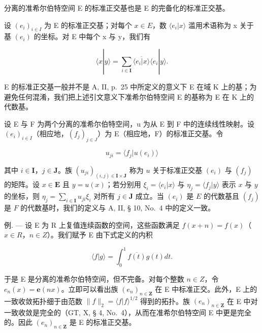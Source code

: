 分离的准希尔伯特空间 E 的标准正交基也是 E 的完备化的标准正交基。

设 \((e_{i})_{i\in I}\) 为 E 的标准正交基；对每个 \(x\in E\)，数 \(\langle e_{i}|x\rangle\) 滥用术语称为 x 关于基 \((e_{i})\) 的坐标。对 E 中每个 x 与 y，我们有

\[
\langle x | y \rangle = \sum_ {i \in \mathbf {I}} \overline {{\langle e _ {i} | x \rangle}} \langle e _ {i} | y \rangle .\tag{3}
\]

E 的标准正交基一般并不是 A, II, p.~25 中所定义的意义下 E 在域 K 上的基；为避免任何混淆，我们把上述引文意义下准希尔伯特空间 E 的基称为 E 在 K 上的代数基。

设 E 与 F 为两个分离的准希尔伯特空间，u 为从 E 到 F 中的连续线性映射。设 \((e_{i})_{i\in I}\)（相应地，\((f_{j})_{j\in J}\)）为 E（相应地，F）的标准正交基。令

\[
u _ {j i} = \langle f _ {j} | u (e _ {i}) \rangle
\]

其中 \(i \in \mathbf{I}\)，\(j \in \mathbf{J}\)。族 \((u_{ji})_{(i,j) \in \mathbf{I} \times \mathbf{J}}\) 称为 \(u\) 关于标准正交基 \((e_i)\) 与 \((f_j)\) 的矩阵。设 \(x \in \mathbf{E}\) 且 \(y = u(x)\)；若分别用 \(\xi_i = \langle e_i | x \rangle\) 与 \(\eta_j = \langle f_j | y \rangle\) 表示 \(x\) 与 \(y\) 的坐标，则 \(\eta_j = \sum_{i \in \mathbf{I}} u_{ji} \xi_i\) 对所有 \(j \in \mathbf{J}\) 成立。当 \((e_i)\) 是 \(E\) 的代数基且 \((f_j)\) 是 \(F\) 的代数基时，我们的定义与 A, II, § 10, No.~4 中的定义一致。

例. --- 设 E 为 R 上复值连续函数的空间，这些函数满足 \(f(x + n) = f(x)\)（\(x \in R\)，\(n \in Z\)）。我们赋予 E 由下式定义的内积

\[
\langle f | g \rangle = \int_ {0} ^ {1} \overline {{{{f (t)}}}} g (t) d t.
\]

于是 E 是分离的准希尔伯特空间，但不完备。对每个整数 \(n \in Z\)，令 \(e_{n}(x) = \mathbf{e}(nx)\)。立即可以看出族 \((e_{n})_{n \in \mathbf{Z}}\) 在 E 中标准正交。此外，E 上的一致收敛拓扑细于由范数 \(\|f\|_{2} = \langle f | f \rangle^{1/2}\) 得到的拓扑。族 \((e_{n})_{n \in \mathbf{Z}}\) 在 E 中对一致收敛是完全的（GT, X, § 4, No.~4），从而在准希尔伯特空间 E 中更是完全的。因此 \((e_{n})_{n \in \mathbf{Z}}\) 是 E 的标准正交基。

